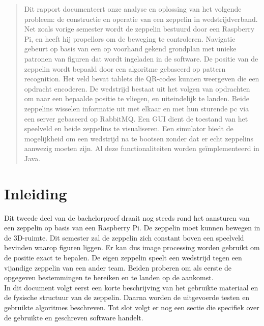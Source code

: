\documentclass[eind]{penoverslag}
\begin{document}
\maketitlepage


\begin{abstract}
Dit rapport documenteert onze analyse en oplossing van het volgende probleem: de constructie en operatie van een zeppelin in wedstrijdverband. Net zoals vorige semester wordt de zeppelin bestuurd door een Raspberry Pi, en heeft hij propellors om de beweging te controleren. Navigatie gebeurt op basis van een op voorhand gekend grondplan met unieke patronen van figuren dat wordt ingeladen in de software. De positie van de zeppelin wordt bepaald door een algoritme gebaseerd op pattern recognition. Het veld bevat tablets die QR-codes kunnen weergeven die een opdracht encoderen. De wedstrijd bestaat uit het volgen van opdrachten om naar een bepaalde positie te vliegen, en uiteindelijk te landen. Beide zeppelins wisselen informatie uit met elkaar en met hun sturende pc via een server gebaseerd op RabbitMQ. Een GUI dient de toestand van het speelveld en beide zeppelins te visualiseren. Een simulator biedt de mogelijkheid om een wedstrijd na te bootsen zonder dat er echt zeppelins aanwezig moeten zijn. Al deze functionaliteiten worden ge\"{i}mplementeerd in Java.\\
\end{abstract}


\tableofcontents\newpage


\section{Inleiding}
Dit tweede deel van de bachelorproef draait nog steeds rond het aansturen van een zeppelin op basis van een Raspberry Pi. De zeppelin moet kunnen bewegen in de 3D-ruimte. Dit semester zal de zeppelin zich constant boven een speelveld bevinden waarop figuren liggen. Er kan dus image processing worden gebruikt om de positie exact te bepalen. De eigen zeppelin speelt een wedstrijd tegen een vijandige zeppelin van een ander team. Beiden proberen om als eerste de opgegeven bestemmingen te bereiken en te landen op de aankomst.\\
In dit document volgt eerst een korte beschrijving van het gebruikte materiaal en de fysische structuur van de zeppelin. Daarna worden de uitgevoerde testen en gebruikte algoritmes beschreven. Tot slot volgt er nog een sectie die specifiek over de gebruikte en geschreven software handelt. 
\end{document}
